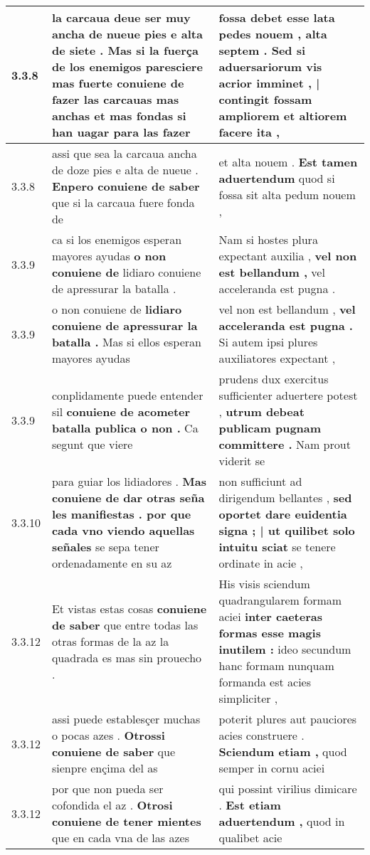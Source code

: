 \begin{tabular}{|p{1cm}|p{6.5cm}|p{6.5cm}|}
3.3.8 & la carcaua deue ser muy ancha de nueue pies e alta de siete . \textbf{ Mas si la fuerça de los enemigos paresciere mas fuerte conuiene de fazer las carcauas mas anchas et mas fondas } si han uagar para las fazer & fossa debet esse lata pedes nouem , alta septem . \textbf{ Sed si aduersariorum vis acrior imminet , | contingit fossam ampliorem } et altiorem facere ita , \\\hline
3.3.8 & assi que sea la carcaua ancha de doze pies e alta de nueue . \textbf{ Enpero conuiene de saber } que si la carcaua fuere fonda de & et alta nouem . \textbf{ Est tamen aduertendum } quod si fossa sit alta pedum nouem , \\\hline
3.3.9 & ca si los enemigos esperan mayores ayudas \textbf{ o non conuiene de } lidiaro conuiene de apressurar la batalla . & Nam si hostes plura expectant auxilia , \textbf{ vel non est bellandum , } vel acceleranda est pugna . \\\hline
3.3.9 & o non conuiene de \textbf{ lidiaro conuiene de apressurar la batalla . } Mas si ellos esperan mayores ayudas & vel non est bellandum , \textbf{ vel acceleranda est pugna . } Si autem ipsi plures auxiliatores expectant , \\\hline
3.3.9 & conplidamente puede entender sil \textbf{ conuiene de acometer batalla publica o non . } Ca segunt que viere & prudens dux exercitus sufficienter aduertere potest , \textbf{ utrum debeat publicam pugnam committere . } Nam prout viderit se \\\hline
3.3.10 & para guiar los lidiadores . \textbf{ Mas conuiene de dar otras seña les manifiestas . por que cada vno viendo aquellas señales } se sepa tener ordenadamente en su az & non sufficiunt ad dirigendum bellantes , \textbf{ sed oportet dare euidentia signa ; | ut quilibet solo intuitu sciat } se tenere ordinate in acie , \\\hline
3.3.12 & Et vistas estas cosas \textbf{ conuiene de saber } que entre todas las otras formas de la az la quadrada es mas sin prouecho . & His visis sciendum quadrangularem formam aciei \textbf{ inter caeteras formas esse magis inutilem : } ideo secundum hanc formam nunquam formanda est acies simpliciter , \\\hline
3.3.12 & assi puede establesçer muchas o pocas azes . \textbf{ Otrossi conuiene de saber } que sienpre ençima del as & poterit plures aut pauciores acies construere . \textbf{ Sciendum etiam , } quod semper in cornu aciei \\\hline
3.3.12 & por que non pueda ser cofondida el az . \textbf{ Otrosi conuiene de tener mientes } que en cada vna de las azes & qui possint virilius dimicare . \textbf{ Est etiam aduertendum , } quod in qualibet acie \\\hline

\end{tabular}
